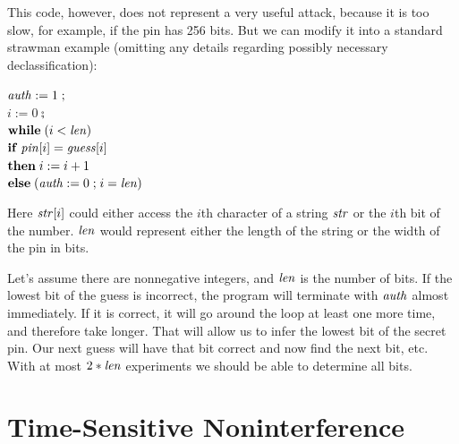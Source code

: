 \documentclass[11pt]{article}
\begin{document}
This code, however, does not represent a very useful attack, because it is too
slow, for example, if the pin has 256 bits.  But we can modify it into a
standard strawman example (omitting any details regarding possibly necessary
declassification):
\begin{tabbing}
  \quad $\mathit{auth} := 1 \mathrel{;}$ \\
  \quad $i := 0 \semi$ \\
  \quad $\mathbf{while}\; (i < \mathit{len})$ \\
  \qquad $\mathbf{if}\; \mathit{pin}[i] = \mathit{guess}[i]$ \\
  \qquad $\mathbf{then}\; i := i+1$ \\
  \qquad $\mathbf{else}\; (\mathit{auth} := 0 \mathrel{;} i = \mathit{len})$
\end{tabbing}
Here $\mathit{str}[i]$ could either access the $i$th character of a string
$\mathit{str}$ or the $i$th bit of the number.  $\mathit{len}$ would represent either
the length of the string or the width of the pin in bits.

Let's assume there are nonnegative integers, and $\mathit{len}$ is the number of
bits.  If the lowest bit of the guess is incorrect, the program will terminate
with $\mathit{auth}$ almost immediately.  If it is correct, it will go around the
loop at least one more time, and therefore take longer.  That will allow us to
infer the lowest bit of the secret pin.  Our next guess will have that bit
correct and now find the next bit, etc.  With at most $2 * \mathit{len}$ experiments
we should be able to determine all bits.

\section{Time-Sensitive Noninterference}
\end{document}
